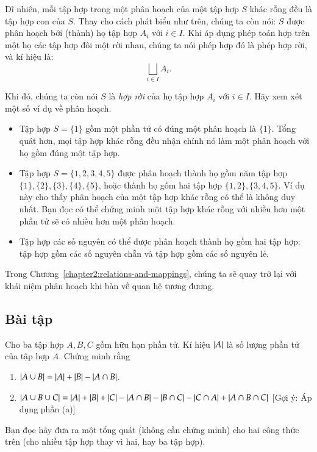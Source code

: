 Dĩ nhiên, mỗi tập hợp trong một phân hoạch của một tập hợp $S$ khác rỗng đều là tập hợp con của $S$. Thay cho cách phát biểu như trên, chúng ta còn nói: $S$ được phân hoạch bởi (thành) họ tập hợp $A_{i}$ với $i\in I$. Khi áp dụng phép toán hợp trên một họ các tập hợp đôi một rời nhau, chúng ta nói phép hợp đó là phép hợp rời, và kí hiệu là:
\[
    \bigsqcup_{i\in I}A_{i}.
\]

Khi đó, chúng ta còn nói $S$ là \textit{hợp rời} của họ tập hợp $A_{i}$ với $i\in I$. Hãy xem xét một số ví dụ về phân hoạch.
\begin{itemize}
    \item Tập hợp $S = \{ 1 \}$ gồm một phần tử có đúng một phân hoạch là $\{ 1 \}$. Tổng quát hơn, mọi tập hợp khác rỗng đều nhận chính nó làm một phân hoạch với họ gồm đúng một tập hợp.
    \item Tập hợp $S = \{ 1, 2, 3, 4, 5 \}$ được phân hoạch thành họ gồm năm tập hợp $\{ 1 \}, \{ 2 \}, \{ 3 \}, \{ 4 \}, \{ 5 \}$, hoặc thành họ gồm hai tập hợp $\{ 1, 2 \}, \{ 3, 4, 5 \}$. Ví dụ này cho thấy phân hoạch của một tập hợp khác rỗng có thể là không duy nhất. Bạn đọc có thể chứng minh một tập hợp khác rỗng với nhiều hơn một phần tử sẽ có nhiều hơn một phân hoạch.
    \item Tập hợp các số nguyên có thể được phân hoạch thành họ gồm hai tập hợp: tập hợp gồm các số nguyên chẵn và tập hợp gồm các số nguyên lẻ.
\end{itemize}

Trong Chương~\ref{chapter2:relations-and-mappings}, chúng ta sẽ quay trở lại với khái niệm phân hoạch khi bàn về quan hệ tương đương.

\subsection*{Bài tập}
\setcounter{exercise}{0}

\begin{exercise}\label{section4:exercise1}
    Cho ba tập hợp $A, B, C$ gồm hữu hạn phần tử. Kí hiệu $\left\vert{A}\right\vert$ là số lượng phần tử của tập hợp $A$. Chứng minh rằng
    \begin{enumerate}[label={(\alph*)}]
        \item $\left\vert{A\cup B}\right\vert = \left\vert{A}\right\vert + \left\vert{B}\right\vert - \left\vert{A\cap B}\right\vert$.
        \item $\left\vert{A\cup B\cup C}\right\vert = \left\vert{A}\right\vert + \left\vert{B}\right\vert + \left\vert{C}\right\vert - \left\vert{A\cap B}\right\vert - \left\vert{B\cap C}\right\vert - \left\vert{C\cap A}\right\vert + \left\vert{A\cap B\cap C}\right\vert$ [Gợi ý: Áp dụng phần (a)]
    \end{enumerate}

    Bạn đọc hãy đưa ra một tổng quát (không cần chứng minh) cho hai công thức trên (cho nhiều tập hợp thay vì hai, hay ba tập hợp).
\end{exercise}

